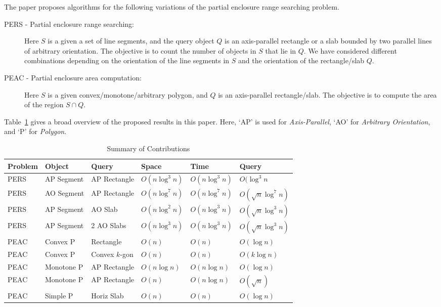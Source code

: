 \documentclass[a4paper,11pt]{article}
\newcommand{\PERS}[0]{PERS}
\newcommand{\PEAC}[0]{PEAC}
\begin{document}
The paper proposes algorithms for the following variations of 
the partial enclosure range searching problem.  
\begin{description}
\item[\PERS{} - Partial enclosure range searching:] Here $S$ 
is a given a set of line segments, and the query object $Q$ 
is an axis-parallel rectangle or a slab bounded by two parallel 
lines of arbitrary orientation. The objective is to count 
the number of objects in $S$ that lie in $Q$. We have 
considered different combinations depending on the orientation 
of the line segments in $S$ and the orientation of the 
rectangle/slab $Q$.
\item[\PEAC{} - Partial enclosure area computation:] Here $S$ 
is a given convex/monotone/arbitrary polygon, and $Q$ is an 
axis-parallel rectangle/slab. The objective is to compute the 
area of the region $S\cap Q$. 
\end{description}

Table~\ref{tab:contributions} gives a broad overview of the 
proposed results in this paper. Here, `AP' is used for {\it 
Axis-Parallel}, `AO' for {\it Arbitrary Orientation}, and 
`P' for {\it Polygon}.

\begin{table}[t]
\caption{Summary of Contributions}
\label{tab:contributions}
\centering
\begin{tabular}{l l l l l l}
\hline \hline
Problem & Object & Query  & Space & Time & Query \\
\hline
\PERS{}& AP Segment & AP Rectangle  & $O(n\log^3n)$ & $O(n\log^3n)$ & $O(\log^3n$ \\
\PERS{} & AO Segment & AP Rectangle  & $O(n\log^7n)$ & $O(n\log^7n)$ & $O(\sqrt{n}\log^7n)$ \\
\PERS{} & AP Segment & AO Slab  & $O(n\log^2n)$ & $O(n\log^3n)$ & $O(\sqrt{n}\log^3n)$ \\
\PERS{} & AP Segment & 2 AO Slabs  & $O(n\log^3n)$ & $O(n\log^3n)$ & $O(\sqrt{n}\log^3n)$ \\
\PEAC{} & Convex P & Rectangle  & $O(n)$ & $O(n)$ & $O(\log n)$ \\
\PEAC{} & Convex P & Convex $k$-gon  & $O(n)$ & $O(n)$ & $O(k \log n)$ \\
\PEAC{} & Monotone P & AP Rectangle  & $O(n\log n)$ & $O(n\log n)$ & $O(\log n)$ \\
\PEAC{} & Monotone P & AP Rectangle  & $O(n)$ & $O(n\log n)$ & $O(\sqrt{n})$ \\
\PEAC{} & Simple P & Horiz Slab  & $O(n)$ & $O(n)$ & $O(\log n)$ \\
\hline
\end{tabular}
\end{table}
\end{document}
